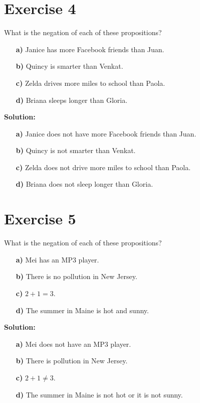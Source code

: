 \documentclass{Axon}
\begin{document}
\section*{Exercise 4}
What is the negation of each of these propositions?
\begin{enumerate}
    \item[\textbf{a)}] Janice has more Facebook friends than Juan.
    \item[\textbf{b)}] Quincy is smarter than Venkat.
    \item[\textbf{c)}] Zelda drives more miles to school than Paola.
    \item[\textbf{d)}] Briana sleeps longer than Gloria.
\end{enumerate}

\noindent
\textbf{Solution:}
\begin{enumerate}
    \item[\textbf{a)}] Janice does not have more Facebook friends than Juan.
    \item[\textbf{b)}] Quincy is not smarter than Venkat.
    \item[\textbf{c)}] Zelda does not drive more miles to school than Paola.
    \item[\textbf{d)}] Briana does not sleep longer than Gloria.
\end{enumerate}

\section*{Exercise 5}
What is the negation of each of these propositions?
\begin{enumerate}
    \item[\textbf{a)}] Mei has an MP3 player.
    \item[\textbf{b)}] There is no pollution in New Jersey.
    \item[\textbf{c)}] \(2 + 1 = 3\).
    \item[\textbf{d)}] The summer in Maine is hot and sunny.
\end{enumerate}

\noindent
\textbf{Solution:}
\begin{enumerate}
    \item[\textbf{a)}] Mei does not have an MP3 player.
    \item[\textbf{b)}] There is pollution in New Jersey.
    \item[\textbf{c)}] \(2 + 1 \neq 3\).
    \item[\textbf{d)}] The summer in Maine is not hot or it is not sunny.
\end{enumerate}
\end{document}
